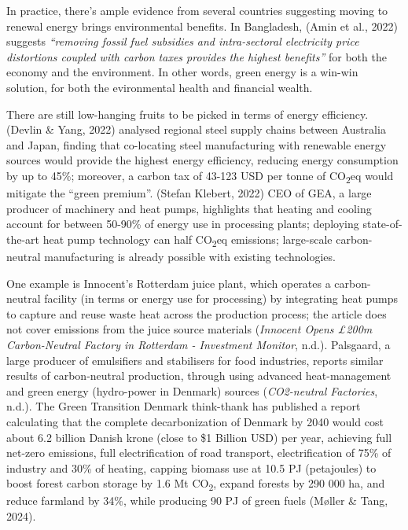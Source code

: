 \documentclass[
  12pt,
  letterpaper,
  DIV=11,
  numbers=noendperiod]{scrartcl}
\begin{document}
In practice, there's ample evidence from several countries suggesting
moving to renewal energy brings environmental benefits. In Bangladesh,
(Amin et al., 2022) suggests \emph{``removing fossil fuel subsidies and
intra-sectoral electricity price distortions coupled with carbon taxes
provides the highest benefits''} for both the economy and the
environment. In other words, green energy is a win-win solution, for
both the evironmental health and financial wealth.

There are still low-hanging fruits to be picked in terms of energy
efficiency. (Devlin \& Yang, 2022) analysed regional steel supply chains
between Australia and Japan, finding that co-locating steel
manufacturing with renewable energy sources would provide the highest
energy efficiency, reducing energy consumption by up to 45\%; moreover,
a carbon tax of 43-123 USD per tonne of CO\textsubscript{2}eq would
mitigate the ``green premium''. (Stefan Klebert, 2022) CEO of GEA, a
large producer of machinery and heat pumps, highlights that heating and
cooling account for between 50-90\% of energy use in processing plants;
deploying state-of-the-art heat pump technology can half
CO\textsubscript{2}eq emissions; large-scale carbon-neutral
manufacturing is already possible with existing technologies.

One example is Innocent's Rotterdam juice plant, which operates a
carbon-neutral facility (in terms or energy use for processing) by
integrating heat pumps to capture and reuse waste heat across the
production process; the article does not cover emissions from the juice
source materials (\emph{Innocent Opens {£}200m Carbon-Neutral Factory in
{Rotterdam} - {Investment Monitor}}, n.d.). Palsgaard, a large producer
of emulsifiers and stabilisers for food industries, reports similar
results of carbon-neutral production, through using advanced
heat-management and green energy (hydro-power in Denmark) sources
(\emph{{CO2-neutral} Factories}, n.d.). The Green Transition Denmark
think-thank has published a report calculating that the complete
decarbonization of Denmark by 2040 would cost about 6.2 billion Danish
krone (close to \$1 Billion USD) per year, achieving full net-zero
emissions, full electrification of road transport, electrification of
75\% of industry and 30\% of heating, capping biomass use at 10.5 PJ
(petajoules) to boost forest carbon storage by 1.6 Mt
CO\textsubscript{2}, expand forests by 290 000 ha, and reduce farmland
by 34\%, while producing 90 PJ of green fuels (Møller \& Tang, 2024).
\end{document}
